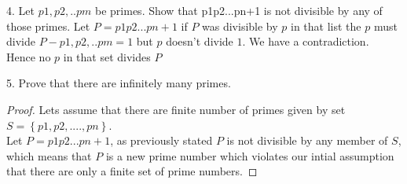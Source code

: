 \documentclass[12pt]{article}
\newenvironment{faq}{\begin{description}[style=nextline]}{\end{description}}
\begin{document}
\begin{faq}
\item[4. Let $p1,p2,..pm$ be primes. Show that p1p2...pn+1 is not divisible by any of those primes.]
  Let $P = p1p2...pn+1$ if $P$ was divisible by $p$ in that list the $p$ must divide $P - p1,p2,..pm=1$ but $p$ doesn't divide $1$. We have a contradiction.\\
  Hence no $p$ in that set divides $P$

\item[5. Prove that there are infinitely many primes.] \\
  \begin{proof}
    Lets assume that there are finite number of primes given by set $S = \left\{  {p1, p2,....,pn}\right\} $.\\
    Let $P = p1p2...pn+1$, as previously stated $P$ is  not divisible by any member of $S$, which means that $P$ is a new prime number which
    violates our intial assumption that there are only a finite set of prime numbers.
  \end{proof}
\end{faq}
\end{document}
